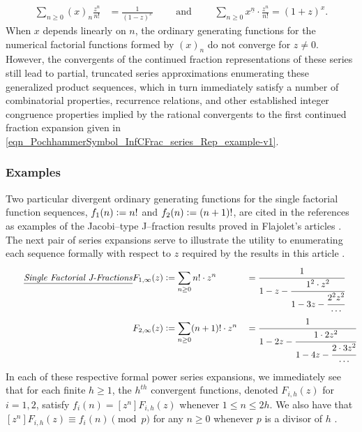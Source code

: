 \documentclass[12pt,reqno]{article}
\numberwithin{sfootnote}{section}
\numberwithin{equation}{section}
\newcommand{\tagtext}[1]{\tag*{\underline{\textit{#1}}}}
\theoremstyle{DefaultTheoremStyle}
\theoremstyle{definition}
\newcommand{\cf}[0]{cf.\ }
\newcommand{\defequals}{\ensuremath{\vcentcolon=}}
\newcommand{\FFactII}[2]{\ensuremath{#1^{\underline{#2}}}}
\newcommand{\Pochhammer}[2]{\ensuremath{\left(#1\right)_{#2}}}
\begin{document}
\begin{align*} 
\sum_{n \geq 0} \Pochhammer{x}{n} \frac{z^n}{n!} & = \frac{1}{(1-z)^{x}} 
     \qquad \text{ and } \qquad 
\sum_{n \geq 0} \FFactII{x}{n} \cdot \frac{z^{n}}{n!} = (1+z)^{x}. 
\end{align*} 
When $x$ depends linearly on $n$, the ordinary generating 
functions for the numerical factorial functions formed by 
$(x)_n$ do not converge for $z \neq 0$. 
However, the convergents of the continued fraction representations of 
these series still lead to partial, truncated series approximations 
enumerating these generalized product sequences, 
which in turn immediately satisfy a number of 
combinatorial properties, recurrence relations, and other 
established integer congruence properties implied by the 
rational convergents to the first continued fraction expansion given in 
\eqref{eqn_PochhammerSymbol_InfCFrac_series_Rep_example-v1}. 

\subsubsection{Examples} 

Two particular divergent ordinary generating functions 
for the single factorial function sequences, 
$f_1(n) \defequals n!$ and $f_2(n) \defequals (n+1)!$, 
are cited in the references as examples of the 
Jacobi--type J--fraction results proved in 
Flajolet's articles 
\citep{FLAJOLET80B,FLAJOLET82} \citep[\cf \S 5.5]{GFLECT}. 
The next pair of series expansions serve to illustrate the utility to 
enumerating each sequence formally with respect to $z$ 
required by the results in this article 
\citep[Thm. 3A; Thm. 3B]{FLAJOLET80B}. 
\begin{align*} 
\tagtext{Single Factorial J-Fractions} 
F_{1,\infty}(z) & \defequals 
     \sum_{n \geq 0} n! \cdot z^n && = 
     \cfrac{1}{1-z-\cfrac{1^2 \cdot z^2}{ 
     1-3z-\cfrac{2^2 z^2}{\cdots}}} \\ 
F_{2,\infty}(z) & \defequals 
     \sum_{n \geq 0} (n+1)! \cdot z^n && = 
     \cfrac{1}{1-2z-\cfrac{1 \cdot 2 z^2}{ 
     1-4z-\cfrac{2 \cdot 3 z^2}{\cdots}}} 
\end{align*} 
In each of these respective formal power series expansions, 
we immediately see that for each finite $h \geq 1$, the 
$h^{th}$ convergent functions, denoted $F_{i,h}(z)$ for $i = 1,2$, 
satisfy $f_i(n) = [z^n] F_{i,h}(z)$ whenever $1 \leq n \leq 2h$. 
We also have that 
$[z^n] F_{i,h}(z) \equiv f_i(n) \pmod{p}$ 
for any $n \geq 0$ whenever $p$ is a divisor of $h$ 
\citep{FLAJOLET82} \citep[\cf \S 5]{GFLECT}. 
\end{document}
